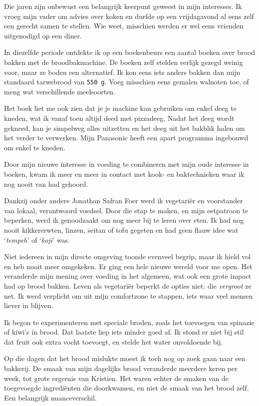 \documentclass[
  11pt,
  dutch,
]{memoir}
\begin{document}
Die jaren zijn onbewust een belangrijk keerpunt geweest in mijn
interesses. Ik vroeg mijn vader om advies over koken en durfde op een
vrijdagavond al eens zelf een gerecht samen te stellen. Wie weet,
misschien werden er wel eens vrienden uitgenodigd op een diner.

In diezelfde periode ontdekte ik op een boekenbeurs een aantal boeken
over brood bakken met de broodbakmachine. De boeken zelf stelden eerlijk
gezegd weinig voor, maar ze boden een alternatief. Ik kon eens iets
anders bakken dan mijn standaard tarwebrood van \texttt{550\ g}. Voeg
misschien eens gemalen walnoten toe, of meng wat verschillende
meelsoorten.

Het boek liet me ook zien dat je je machine kan gebruiken om enkel deeg
te kneden, wat ik vanaf toen altijd deed met pizzadeeg. Nadat het deeg
wordt gekneed, kan je simpelweg alles uitzetten en het deeg uit het
bakblik halen om het verder te verwerken. Mijn Panasonic heeft een apart
programma ingebouwd om enkel te kneden.

Door mijn nieuwe interesse in voeding te combineren met mijn oude
interesse in boeken, kwam ik meer en meer in contact met kook- en
baktechnieken waar ik nog nooit van had gehoord.

Dankzij onder andere Jonathan Safran Foer werd ik vegetariër en
voorstander van lokaal, verantwoord voedsel. Door die stap te maken, en
mijn eetpatroon te beperken, werd ik genoodzaakt om nog meer bij te
leren over eten. Ik had nog nooit kikkererwten, linzen, seitan of tofu
gegeten en had geen flauw idee wat `\emph{tempeh}' of `\emph{koji}' was.

Niet iedereen in mijn directe omgeving toonde evenveel begrip, maar ik
hield vol en heb nooit meer omgekeken. Er ging een hele nieuwe wereld
voor me open. Het veranderde mijn mening over voeding in het algemeen,
wat ook een grote impact had op brood bakken. Leven als vegetariër
beperkt de opties niet: die \emph{vergroot} ze net. Ik werd verplicht om
uit mijn comfortzone te stappen, iets waar veel mensen liever in
blijven.

Ik begon te experimenteren met speciale broden, zoals het toevoegen van
spinazie of kiwi's in brood. Dat laatste liep iets minder goed af. Ik
stond er niet bij stil dat fruit ook extra vocht toevoegt, en stelde het
water onvoldoende bij.

Op die dagen dat het brood mislukte moest ik toch nog op zoek gaan naar
een bakkerij. De smaak van mijn dagelijks brood veranderde meerdere
keren per week, tot grote ergernis van Kristien. Het waren echter de
smaken van de toegevoegde ingrediënten die doorkwamen, en niet de smaak
van het brood zelf. Een belangrijk nuanceverschil.
\end{document}
